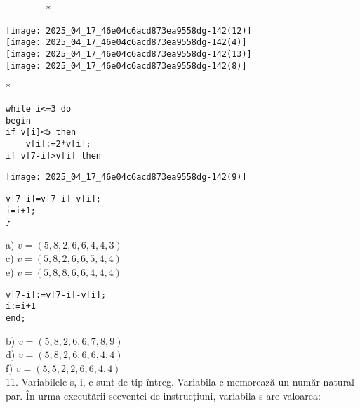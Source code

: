 \begin{verbatim}
        *
\end{verbatim}

\texttt{[image: 2025\_04\_17\_46e04c6acd873ea9558dg-142(12)]}\\
\texttt{[image: 2025\_04\_17\_46e04c6acd873ea9558dg-142(4)]}\\
\texttt{[image: 2025\_04\_17\_46e04c6acd873ea9558dg-142(13)]}\\
\texttt{[image: 2025\_04\_17\_46e04c6acd873ea9558dg-142(8)]}

\begin{verbatim}
*
\end{verbatim}

\begin{verbatim}
while i<=3 do
begin
if v[i]<5 then
    v[i]:=2*v[i];
if v[7-i]>v[i] then
\end{verbatim}

\begin{center}
\texttt{[image: 2025\_04\_17\_46e04c6acd873ea9558dg-142(9)]}
\end{center}

\begin{verbatim}
v[7-i]=v[7-i]-v[i];
i=i+1;
}
\end{verbatim}

a) $v=(5,8,2,6,6,4,4,3)$\\
c) $v=(5,8,2,6,6,5,4,4)$\\
e) $v=(5,8,8,6,6,4,4,4)$

\begin{verbatim}
v[7-i]:=v[7-i]-v[i];
i:=i+1
end;
\end{verbatim}

b) $v=(5,8,2,6,6,7,8,9)$\\
d) $v=(5,8,2,6,6,6,4,4)$\\
f) $v=(5,5,2,2,6,6,4,4)$\\
11. Variabilele s, i, c sunt de tip întreg. Variabila c memorează un număr natural par. În urma executării secvenței de instrucțiuni, variabila s are valoarea:


